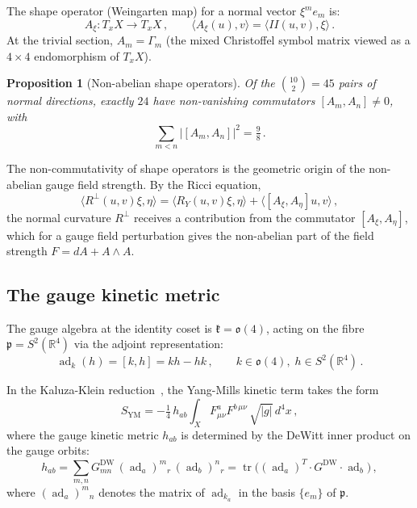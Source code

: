 \documentclass[12pt,a4paper]{article}
\newtheorem{proposition}[theorem]{Proposition}
\theoremstyle{definition}
\newcommand{\tr}{\operatorname{tr}}
\newcommand{\ad}{\operatorname{ad}}
\newcommand{\R}{\mathbb{R}}
\begin{document}
The shape operator (Weingarten map) for a normal vector $\xi^m e_m$ is:
\begin{equation}
A_\xi\colon T_xX \to T_xX\,,\qquad \langle A_\xi(u), v \rangle = \langle II(u,v), \xi \rangle\,.
\end{equation}
At the trivial section, $A_m = \Gamma_m$ (the mixed Christoffel symbol matrix viewed as a $4 \times 4$ endomorphism of $T_xX$).

\begin{proposition}[Non-abelian shape operators]
\label{prop:shape}
Of the $\binom{10}{2} = 45$ pairs of normal directions, exactly $24$ have non-vanishing commutators $[A_m, A_n] \neq 0$, with
\begin{equation}
\sum_{m < n} |[A_m, A_n]|^2 = \tfrac{9}{8}\,.
\end{equation}
\end{proposition}

The non-commutativity of shape operators is the geometric origin of the non-abelian gauge field strength.
By the Ricci equation,
\begin{equation}
\label{eq:ricci}
\langle R^\perp(u,v)\xi, \eta \rangle = \langle R_Y(u,v)\xi, \eta \rangle + \langle [A_\xi, A_\eta]u, v \rangle\,,
\end{equation}
the normal curvature $R^\perp$ receives a contribution from the commutator $[A_\xi, A_\eta]$, which for a gauge field perturbation gives the non-abelian part of the field strength $F = dA + A \wedge A$.

\subsection{The gauge kinetic metric}

The gauge algebra at the identity coset is $\mathfrak{k} = \mathfrak{o}(4)$, acting on the fibre $\mathfrak{p} = S^2(\R^4)$ via the adjoint representation:
\begin{equation}
\ad_k(h) = [k, h] = kh - hk\,,\qquad k \in \mathfrak{o}(4),\; h \in S^2(\R^4)\,.
\end{equation}

In the Kaluza-Klein reduction~\cite{Bailin1987}, the Yang-Mills kinetic term takes the form
\begin{equation}
\label{eq:YM_action}
S_{\mathrm{YM}} = -\tfrac{1}{4}\, h_{ab}\! \int_X F^a_{\mu\nu} F^{b\,\mu\nu}\, \sqrt{|g|}\, d^4x\,,
\end{equation}
where the gauge kinetic metric $h_{ab}$ is determined by the DeWitt inner product on the gauge orbits:
\begin{equation}
\label{eq:gauge_kinetic}
h_{ab} = \sum_{m,n} G^{\mathrm{DW}}_{mn}\, (\ad_a)^m{}_r\, (\ad_b)^n{}_r = \tr\!\big((\ad_a)^T\! \cdot G^{\mathrm{DW}} \cdot \ad_b\big)\,,
\end{equation}
where $(\ad_a)^m{}_n$ denotes the matrix of $\ad_{k_a}$ in the basis $\{e_m\}$ of $\mathfrak{p}$.
\end{document}

